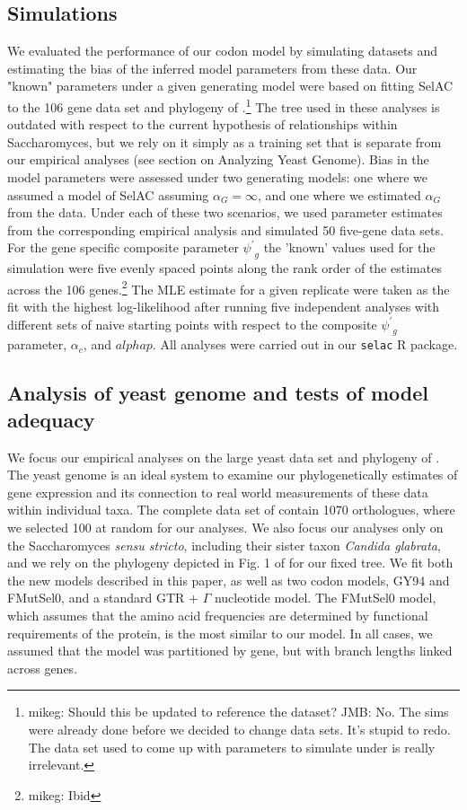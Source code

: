\documentclass{article}
\newcommand{\alphac}{\ensuremath{\alpha_c}\xspace}
\newcommand{\alphag}{\ensuremath{\alpha_G}\xspace}
\newcommand{\psiprime}{\ensuremath{\psi^\prime}\xspace}
\begin{document}
\subsection*{Simulations}
We evaluated the performance of our codon model by simulating datasets and estimating the bias of the inferred model parameters from these data.
Our "known" parameters under a given generating model were based on fitting SelAC to the 106 gene data set and phylogeny of \citet{RokasEtAl2003}.\footnote{mikeg: Should this be updated to reference the \citet{SalichosAndRokas2013} dataset? JMB: No. The sims were already done before we decided to change data sets. It's stupid to redo. The data set used to come up with parameters to simulate under is really irrelevant.}
The tree used in these analyses is outdated with respect to the current hypothesis of relationships within Saccharomyces, but we rely on it simply as a training set that is separate from our empirical analyses (see section on Analyzing Yeast Genome).
Bias in the model parameters were assessed under two generating models: one where we assumed a model of SelAC assuming $\alphag = \infty$, and one where we estimated $\alphag$ from the data.
Under each of these two scenarios, we used parameter estimates from the corresponding empirical analysis and simulated 50 five-gene data sets.
For the gene specific composite parameter $\psiprime_g$ the 'known' values used for the simulation were five evenly spaced points along the rank order of the estimates across the 106 genes.\footnote{mikeg: Ibid}
The MLE estimate for a given replicate were taken as the fit with the highest log-likelihood after running five independent analyses with different sets of naive starting points with respect to the composite $\psiprime_g$ parameter, $\alphac$, and $alphap$.
All analyses were carried out in our \texttt{selac} R package.

\subsection*{Analysis of yeast genome and tests of model adequacy}
We focus our empirical analyses on the large yeast data set and phylogeny of \citet{SalichosAndRokas2013}.
The yeast genome is an ideal system to examine our phylogenetically estimates of gene expression and its connection to real world measurements of these data within individual taxa.
The complete data set of \citet{SalichosAndRokas2013} contain 1070 orthologues, where we selected 100 at random for our analyses.
We also focus our analyses only on the Saccharomyces \emph{sensu stricto}, including their sister taxon \emph{Candida glabrata}, and we rely on the phylogeny depicted in Fig. 1 of \citet{SalichosAndRokas2013} for our fixed tree.
We fit both the new models described in this paper, as well as two codon models, GY94 and FMutSel0, and a standard GTR + $\Gamma$ nucleotide model.
The FMutSel0 model, which assumes that the amino acid frequencies are determined by functional requirements of the protein, is the most similar to our model. 
In all cases, we assumed that the model was partitioned by gene, but with branch lengths linked across genes.
\end{document}
